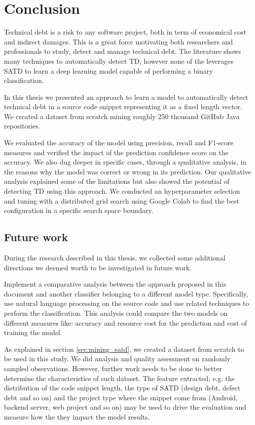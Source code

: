 \chapter{Conclusion}

Technical debt is a risk to any software project, both in term of economical cost and indirect damages. This is a great force motivating both researchers and professionals to study, detect and manage technical debt. 
The literature shows many techniques to automatically detect TD, however none of the leverages SATD to learn a deep learning model capable of performing a binary classification.

In this thesis we presented an approach to learn a model to automatically detect technical debt in a source code snippet representing it as a fixed length vector.
We created a dataset from scratch mining roughly 250 thousand GitHub Java repositories. 

We evaluated the accuracy of the model using precision, recall and F1-score measures and verified the impact of the prediction confidence score on the accuracy. We also dug deeper in specific cases, through a qualitative analysis, in the reasons why the model was correct or wrong in its prediction. Our qualitative analysis explained some of the limitations but also showed the potential of detecting TD using this approach.
We conducted an hyperparameter selection and tuning with a distributed grid search using Google Colab to find the best configuration in a specific search space boundary.

\section{Future work}

During the research described in this thesis, we collected some additional directions we deemed worth to be investigated in future work.

Implement a comparative analysis between the approach proposed in this document and another classifier belonging to a different model type. Specifically, use natural language processing on the source code and use related techniques to perform the classification. This analysis could compare the two models on different measures like: accuracy and resource cost for the prediction and cost of training the model.

As explained in section \ref{sec:mining_satd}, we created a dataset from scratch to be used in this study. We did analysis and quality assessment on randomly sampled observations. However, further work needs to be done to better determine the characteristics of such dataset. The feature extracted, e.g. the distribution of the code snippet length, the type of SATD (design debt, defect debt and so on) and the project type where the snippet come from (Android, backend server, web project and so on) may be used to drive the evaluation and measure how the they impact the model results.

